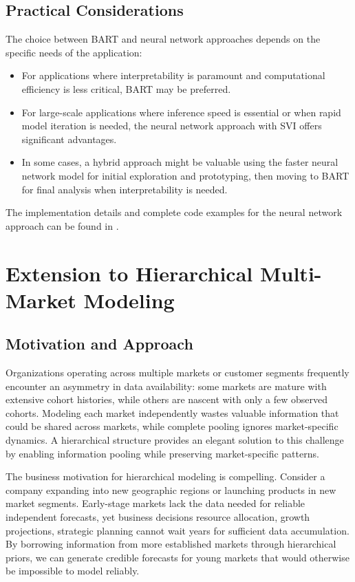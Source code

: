 \documentclass[11pt]{amsart}
\theoremstyle{definition}
\begin{document}
\subsection{Practical Considerations}

The choice between BART and neural network approaches depends on the specific needs of the application:

\begin{itemize}
    \item For applications where interpretability is paramount and computational efficiency is less critical, BART may be
          preferred.

    \item For large-scale applications where inference speed is essential or when rapid model iteration is needed, the neural
          network approach with SVI offers significant advantages.

    \item In some cases, a hybrid approach might be valuable using the faster neural network model for initial exploration
          and prototyping, then moving to BART for final analysis when interpretability is needed.
\end{itemize}

The implementation details and complete code examples for the neural network approach can be found in
\cite{orduz_revenue_retention_numpyro}.

\section{Extension to Hierarchical Multi-Market Modeling}\label{sec:hierarchical}

\subsection{Motivation and Approach}

Organizations operating across multiple markets or customer segments frequently encounter an asymmetry in data
availability: some markets are mature with extensive cohort histories, while others are nascent with only a few observed
cohorts. Modeling each market independently wastes valuable information that could be shared across markets, while complete
pooling ignores market-specific dynamics. A hierarchical structure provides an elegant solution to this challenge by enabling
information pooling while preserving market-specific patterns.

The business motivation for hierarchical modeling is compelling. Consider a company expanding into new geographic regions or
launching products in new market segments. Early-stage markets lack the data needed for reliable independent forecasts, yet
business decisions resource allocation, growth projections, strategic planning cannot wait years for sufficient data
accumulation. By borrowing information from more established markets through hierarchical priors, we can generate credible
forecasts for young markets that would otherwise be impossible to model reliably. \\
\end{document}
